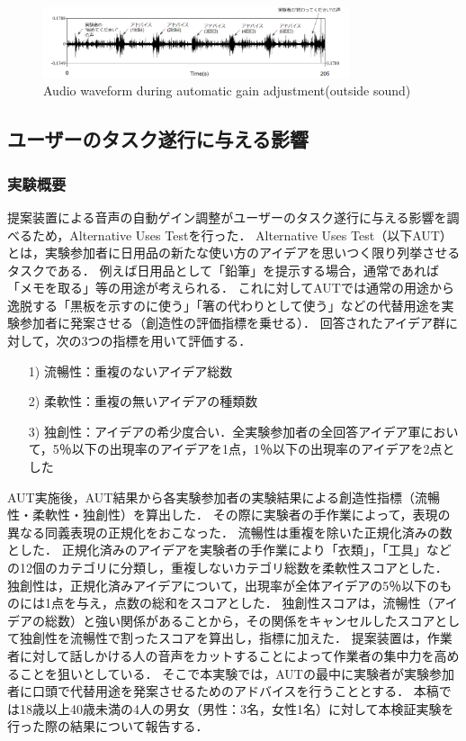 \documentclass[a4paper]{jarticle}
\begin{document}
  \begin{figure}[htbp]
    \begin{center}
    \includegraphics[width=90mm]{outersound.PNG}
    \caption{Audio waveform during automatic gain adjustment(outside sound)}
    \label{fig:outsidesound}
    \end{center}
    \end{figure}
\subsection{ユーザーのタスク遂行に与える影響}
\subsubsection{実験概要}
提案装置による音声の自動ゲイン調整がユーザーのタスク遂行に与える影響を調べるため，Alternative Uses Test\cite{AUT}を行った．
Alternative Uses Test（以下AUT）とは，実験参加者に日用品の新たな使い方のアイデアを思いつく限り列挙させるタスクである．
例えば日用品として「鉛筆」を提示する場合，通常であれば「メモを取る」等の用途が考えられる．
これに対してAUTでは通常の用途から逸脱する「黒板を示すのに使う」「箸の代わりとして使う」などの代替用途を実験参加者に発案させる（創造性の評価指標を乗せる）．
回答されたアイデア群に対して，次の3つの指標を用いて評価する．
\begin{enumerate}
    \item[1)]流暢性：重複のないアイデア総数
    \item[2)]柔軟性：重複の無いアイデアの種類数
    \item[3)]独創性：アイデアの希少度合い．全実験参加者の全回答アイデア軍において，5％以下の出現率のアイデアを1点，1％以下の出現率のアイデアを2点とした
\end{enumerate}

AUT実施後，AUT結果から各実験参加者の実験結果による創造性指標（流暢性・柔軟性・独創性）を算出した．
その際に実験者の手作業によって，表現の異なる同義表現の正規化をおこなった．
流暢性は重複を除いた正規化済みの数とした．
正規化済みのアイデアを実験者の手作業により「衣類」，「工具」などの12個のカテゴリに分類し，重複しないカテゴリ総数を柔軟性スコアとした．
独創性は，正規化済みアイデアについて，出現率が全体アイデアの5％以下のものには1点を与え，点数の総和をスコアとした．
独創性スコアは，流暢性（アイデアの総数）と強い関係があることから，その関係をキャンセルしたスコアとして独創性を流暢性で割ったスコアを算出し，指標に加えた\cite{AUT2}．
提案装置は，作業者に対して話しかける人の音声をカットすることによって作業者の集中力を高めることを狙いとしている．
そこで本実験では，AUTの最中に実験者が実験参加者に口頭で代替用途を発案させるためのアドバイスを行うこととする．
本稿では18歳以上40歳未満の4人の男女（男性：3名，女性1名）に対して本検証実験を行った際の結果について報告する．
\end{document}
